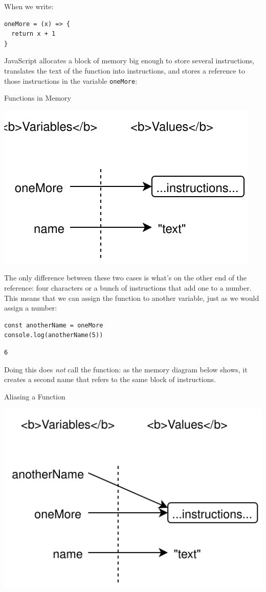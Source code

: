 When we write:

\begin{verbatim}
oneMore = (x) => {
  return x + 1
}
\end{verbatim}

JavaScript allocates a block of memory big enough to store several
instructions, translates the text of the function into instructions, and
stores a reference to those instructions in the variable
\texttt{oneMore}:

Functions in Memory

\includegraphics{../../files/callbacks-one-more.svg}

The only difference between these two cases is what's on the other end
of the reference: four characters or a bunch of instructions that add
one to a number. This means that we can assign the function to another
variable, just as we would assign a number:

\begin{verbatim}
const anotherName = oneMore
console.log(anotherName(5))
\end{verbatim}

\begin{verbatim}
6
\end{verbatim}

Doing this does \emph{not} call the function: as the memory diagram
below shows, it creates a second name that refers to the same block of
instructions.

Aliasing a Function

\includegraphics{../../files/callbacks-alias-function.svg}

